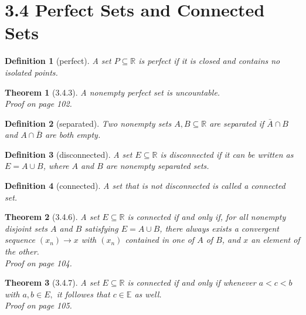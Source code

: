 \documentclass{article}
\newtheorem{definition}{Definition}
\newtheorem{thm}{Theorem}
\begin{document}
\section*{3.4 Perfect Sets and Connected Sets}

\begin{definition}[perfect]
    A set $P \subseteq \mathbb{R}$ is perfect if it is closed and contains no isolated points.
\end{definition}

\begin{thm}[3.4.3]
    A nonempty perfect set is uncountable. \\ Proof on page 102.
\end{thm}

\begin{definition}[separated]
    Two nonempty sets $A,B \subseteq \mathbb{R}$ are separated if $\bar{A} \cap B$ and $A \cap \bar{B}$ are both empty.
\end{definition}

\begin{definition}[disconnected]
    A set $E \subseteq \mathbb{R}$ is disconnected if it can be written as $E = A \cup B$, where $A$ and $B$ are nonempty separated sets.
\end{definition}

\begin{definition}[connected]
    A set that is not disconnected is called a connected set.
\end{definition}

\begin{thm}[3.4.6]
    A set $E \subseteq \mathbb{R}$ is connected if and only if, for all nonempty disjoint sets $A$ and $B$ satisfying $ E = A \cup B$, there always exists a convergent sequence $(x_n) \rightarrow x$ with $(x_n)$ contained in one of $A$ of $B$, and $x$ an element of the other. \\ Proof on page 104.
\end{thm}

\begin{thm}[3.4.7]
    A set $E \subseteq \mathbb{R}$ is connected if and only if whenever $a < c < b$ with $a,b \in E,$ it followes that $c \in \mathbb{E}$ as well. \\ Proof on page 105.
\end{thm}
\end{document}
